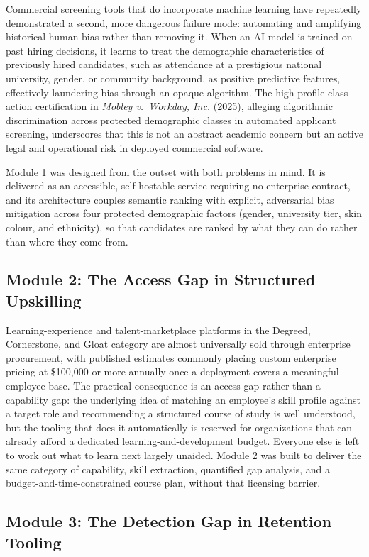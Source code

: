\documentclass[11pt,a4paper]{article}
\begin{document}
Commercial screening tools that do incorporate machine learning have repeatedly demonstrated a second, more dangerous failure mode: automating and amplifying historical human bias rather than removing it. When an AI model is trained on past hiring decisions, it learns to treat the demographic characteristics of previously hired candidates, such as attendance at a prestigious national university, gender, or community background, as positive predictive features, effectively laundering bias through an opaque algorithm. The high-profile class-action certification in \textit{Mobley v.\ Workday, Inc.} (2025), alleging algorithmic discrimination across protected demographic classes in automated applicant screening, underscores that this is not an abstract academic concern but an active legal and operational risk in deployed commercial software.

Module 1 was designed from the outset with both problems in mind. It is delivered as an accessible, self-hostable service requiring no enterprise contract, and its architecture couples semantic ranking with explicit, adversarial bias mitigation across four protected demographic factors (gender, university tier, skin colour, and ethnicity), so that candidates are ranked by what they can do rather than where they come from.

\subsection{Module 2: The Access Gap in Structured Upskilling}

Learning-experience and talent-marketplace platforms in the Degreed, Cornerstone, and Gloat category are almost universally sold through enterprise procurement, with published estimates commonly placing custom enterprise pricing at \$100{,}000 or more annually once a deployment covers a meaningful employee base. The practical consequence is an access gap rather than a capability gap: the underlying idea of matching an employee's skill profile against a target role and recommending a structured course of study is well understood, but the tooling that does it automatically is reserved for organizations that can already afford a dedicated learning-and-development budget. Everyone else is left to work out what to learn next largely unaided. Module 2 was built to deliver the same category of capability, skill extraction, quantified gap analysis, and a budget-and-time-constrained course plan, without that licensing barrier.

\subsection{Module 3: The Detection Gap in Retention Tooling}
\end{document}
